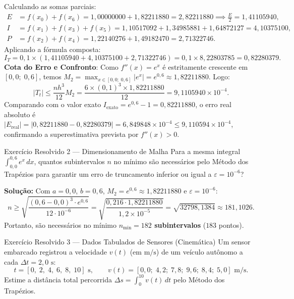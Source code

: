 \documentclass[11pt,a4paper]{article}
\begin{document}
Calculando as somas parciais:
\begin{align*}
    E &= f(x_0) + f(x_6) = 1{,}00000000 + 1{,}82211880 = 2{,}82211880 \implies \frac{E}{2} = 1{,}41105940,\\
    I &= f(x_1) + f(x_3) + f(x_5) = 1{,}10517092 + 1{,}34985881 + 1{,}64872127 = 4{,}10375100,\\
    P &= f(x_2) + f(x_4) = 1{,}22140276 + 1{,}49182470 = 2{,}71322746.
\end{align*}
Aplicando a fórmula composta:
\[
I_T = 0{,}1 \times (1{,}41105940 + 4{,}10375100 + 2{,}71322746) = 0{,}1 \times 8{,}22803785 = 0{,}82280379.
\]
\textbf{Cota do Erro e Confronto}: Como $f''(x) = e^x$ é estritamente crescente em $[0{,}0;\; 0{,}6]$, temos $M_2 = \max_{x \in [0{,}0;\; 0{,}6]} |e^x| = e^{0{,}6} \approx 1{,}82211880$. Logo:
\[
|T_t| \le \frac{n h^3}{12} M_2 = \frac{6 \times (0{,}1)^3 \times 1{,}82211880}{12} = 9{,}1105940 \times 10^{-4}.
\]
Comparando com o valor exato $I_{\text{exato}} = e^{0,6} - 1 = 0{,}82211880$, o erro real absoluto é $|E_{\text{real}}| = |0{,}82211880 - 0{,}82280379| = 6{,}849848 \times 10^{-4} \le 9{,}110594 \times 10^{-4}$, confirmando a superestimativa prevista por $f''(x) > 0$.

\begin{teobox}{Exercício Resolvido 2 --- Dimensionamento de Malha}
Para a mesma integral $\int_{0,0}^{0,6} e^x\,dx$, quantos subintervalos $n$ no mínimo são necessários pelo Método dos Trapézios para garantir um erro de truncamento inferior ou igual a $\varepsilon = 10^{-6}$?
\end{teobox}

\textbf{Solução:}
Com $a = 0{,}0$, $b = 0{,}6$, $M_2 = e^{0,6} \approx 1{,}82211880$ e $\varepsilon = 10^{-6}$:
\[
n \ge \sqrt{\frac{(0{,}6 - 0{,}0)^3 \cdot e^{0,6}}{12 \cdot 10^{-6}}} = \sqrt{\frac{0{,}216 \cdot 1{,}82211880}{1{,}2 \times 10^{-5}}} = \sqrt{32798{,}1384} \approx 181{,}1026.
\]
Portanto, são necessários no mínimo \textbf{$n_{\min} = 182$ subintervalos} ($183$ pontos).

\begin{teobox}{Exercício Resolvido 3 --- Dados Tabulados de Sensores (Cinemática)}
Um sensor embarcado registrou a velocidade $v(t)$ (em $\text{m/s}$) de um veículo autônomo a cada $\Delta t = 2{,}0\text{ s}$:
\[
t = [0,\; 2,\; 4,\; 6,\; 8,\; 10]\text{ s}, \qquad v(t) = [0{,}0;\; 4{,}2;\; 7{,}8;\; 9{,}6;\; 8{,}4;\; 5{,}0]\text{ m/s}.
\]
Estime a distância total percorrida $\Delta s = \int_0^{10} v(t)\,dt$ pelo Método dos Trapézios.
\end{teobox}
\end{document}
